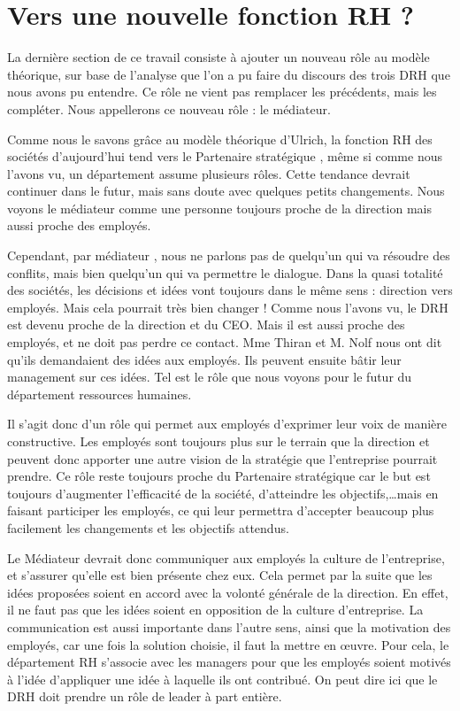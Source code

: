 \section{Vers une nouvelle fonction RH ?}

La dernière section de ce travail consiste à ajouter un nouveau rôle au modèle théorique, sur base de l'analyse que l'on a pu faire du discours des trois DRH que nous avons pu entendre. Ce rôle ne vient pas remplacer les précédents, mais les compléter.  Nous appellerons ce nouveau rôle : le \og{}médiateur\fg{}.\newline

Comme nous le savons grâce au modèle théorique d'Ulrich, la fonction RH des sociétés d'aujourd'hui tend vers le \og{}Partenaire stratégique \fg{}, même si comme nous l'avons vu, un département assume plusieurs rôles. Cette tendance devrait continuer dans le futur, mais sans doute avec quelques petits changements. Nous voyons le médiateur comme une personne toujours proche de la direction mais aussi proche des employés. \newline

Cependant, par \og{}médiateur \fg{}, nous ne parlons pas de quelqu'un qui va résoudre des conflits, mais bien quelqu'un qui va permettre le dialogue. Dans la quasi totalité des sociétés, les décisions et idées vont toujours dans le même sens : direction vers employés. Mais cela pourrait très bien changer ! Comme nous l'avons vu, le DRH est devenu proche de la direction et du CEO. Mais il est aussi proche des employés, et ne doit pas perdre ce contact. Mme Thiran et M. Nolf nous ont dit qu'ils demandaient des idées aux employés. Ils peuvent ensuite bâtir leur management sur ces idées. Tel est le rôle que nous voyons pour le futur du département ressources humaines. \newline

Il s'agit donc d'un rôle qui permet aux employés d'exprimer leur voix de manière constructive. Les employés sont toujours plus sur le terrain que la direction et peuvent donc apporter une autre vision de la stratégie que l'entreprise pourrait prendre. Ce rôle reste toujours proche du \og{}Partenaire stratégique \fg{} car le but est toujours d'augmenter l'efficacité de la société, d'atteindre les objectifs,\ldots mais en faisant participer les employés, ce qui leur permettra d'accepter beaucoup plus facilement les changements et les objectifs attendus.\newline

Le \og{}Médiateur\fg{} devrait donc communiquer aux employés la culture de l'entreprise, et s'assurer qu'elle est bien présente chez eux. Cela permet par la suite que les idées proposées soient en accord avec la volonté générale de la direction. En effet, il ne faut pas que les idées soient en opposition de la culture d'entreprise. La communication est aussi importante dans l'autre sens, ainsi que la motivation des employés, car une fois la solution choisie, il faut la mettre en \oe{}uvre. Pour cela, le département RH s'associe avec les managers pour que les employés soient motivés à l'idée d'appliquer une idée à laquelle ils ont contribué. On peut dire ici que le DRH doit prendre un rôle de leader à part entière. \newline

